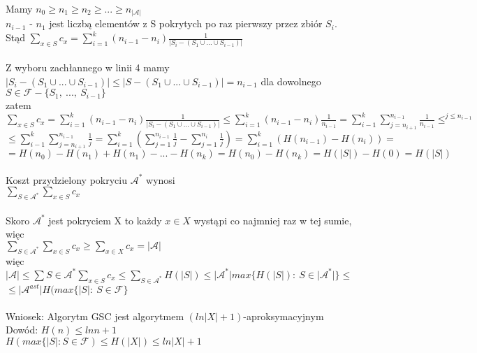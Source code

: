 Mamy $n_0\geq n_1\geq n_2\geq ...\geq n_{\vert\mathcal{A}\vert}$\\
\tab $n_{i-1}$ - $n_1$ jest liczbą elementów z S pokrytych po raz pierwszy przez zbiór $S_i$.\\
Stąd $\sum_{x\in S}c_x = \sum_{i=1}^{k}(n_{i-1}-n_i)\frac{1}{\vert S_i - (S_1 \cup ... \cup S_{i-1})\vert}$\\\\
Z wyboru zachłannego w linii 4 mamy $\vert S_i - (S_1 \cup ... \cup S_{i-1})\vert \leq \vert S - (S_1 \cup ... \cup S_{i-1})\vert = n_{i-1}$ dla dowolnego $S \in \mathcal{F} - \lbrace S_1,\ ...,\ S_{i-1}\rbrace$\\
\tab zatem\\
$\sum_{x\in S} c_x = \sum_{i=1}^{k} (n_{i-1}-n_i)\frac{1}{\vert S_i - (S_1 \cup ... \cup S_{i-1})\vert} \leq \sum_{i=1}^{k}(n_{i-1}- n_i)\frac{1}{n_{i-1}}=\sum_{i-1}^{k}\sum_{j=n_{i+1}}^{n_{i-1}}\frac{1}{n_{i-1}}\leq^{j\leq n_{i-1}}$\\
$\leq \sum_{i-1}^{k}\sum_{j=n_{i+1}}^{n_{i-1}}\frac{1}{j}=\sum_{i=1}^{k}(\sum_{j=1}^{n_{i-1}} \frac{1}{j}- \sum_{j=1}^{n_i} \frac{1}{j}) = \sum_{i=1}^{k} (H(n_{i-1}) - H(n_i)) = $\\
$ = H(n_0) - H(n_1) + H(n_1) - ... - H(n_k) = H(n_0) - H(n_k) = H(\vert S\vert ) - H(0) = H(\vert S\vert )$\\\\
Koszt przydzielony pokryciu $\mathcal{A}^{\ast}$ wynosi \\
\tab $\sum_{S\in \mathcal{A}^{\ast}}\sum_{x\in S}c_x$\\\\
Skoro $\mathcal{A}^{\ast}$ jest pokryciem X to każdy $x \in X$ wystąpi co najmniej raz w tej sumie,\\
więc\\
\tab $\sum_{S\in \mathcal{A}^{\ast}}\sum_{x\in S}c_x \geq \sum_{x\in X}c_x = \vert \mathcal{A}\vert$\\
więc\\
\tab $\vert \mathcal{A}\vert \leq \sum{S\in \mathcal{A}^{\ast}}\sum_{x\in S}c_x \leq \sum_{S\in \mathcal{A}^{\ast}}H(\vert S\vert )\leq \vert \mathcal{A}^{\ast}\vert max\lbrace H(\vert S\vert):\ S\in \vert \mathcal{A}^{\ast}\vert\rbrace\leq$\\
\tab $\leq\vert\mathcal{A}^{ast}\vert H(max\lbrace\vert S\vert :\ S\in \mathcal{F}\rbrace$\\\\
Wniosek: Algorytm GSC jest algorytmem $(ln\vert X \vert + 1)$-aproksymacyjnym\\
Dowód: $H(n)\leq lnn+1$\\
\tab $H(max\lbrace\vert S\vert :S\in \mathcal{F})\leq H(\vert X\vert )\leq ln\vert X\vert + 1$
